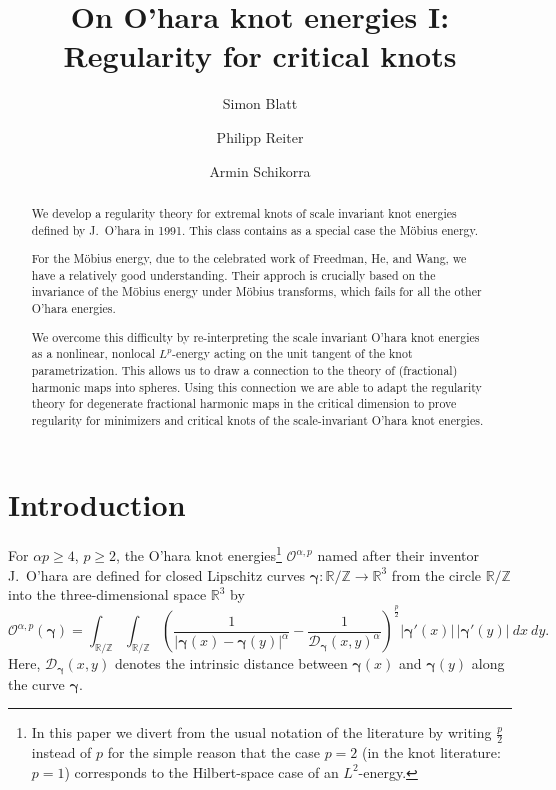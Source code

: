 \documentclass[a4paper,10pt,intlimits,ngerman]{amsart}
\title[O'hara knot energies I]{On O'hara knot energies I: Regularity for critical knots}
\author{Simon Blatt}
\author{Philipp Reiter}
\author{Armin Schikorra}
\numberwithin{equation}{section}
\newcommand{\R}{\mathbb{R}}
\newcommand{\Z}{\mathbb{Z}}
\newcommand{\sol}{{\boldsymbol{\gamma}}}
\newcommand{\brac}[1]{\left ( #1 \right )}
\begin{document}

\begin{abstract}
We develop a regularity theory for extremal knots of scale invariant knot energies defined by J.~O'hara in 1991. This class contains as a special case the M\"obius energy.  

For the M\"obius energy, due to the celebrated work of Freedman, He, and Wang, we have a relatively good understanding. Their approch is crucially based on the invariance of the M\"obius energy under M\"obius transforms, which fails for all the other O'hara energies. 

We overcome this difficulty by re-interpreting the scale invariant O'hara knot energies as a nonlinear, nonlocal $L^p$-energy acting on the unit tangent of the knot parametrization. This allows us to draw a connection to the theory of (fractional) harmonic maps into spheres. Using this connection we are able to adapt the regularity theory for degenerate fractional harmonic maps in the critical dimension to prove regularity for minimizers and critical knots of the scale-invariant O'hara knot energies.
\end{abstract}



\maketitle
\tableofcontents

\section{Introduction}
For $\alpha p \geq 4$, $p \geq 2$, the O'hara knot energies\footnote{In this paper we divert from the usual notation of the literature by writing $\frac{p}{2}$ instead of $p$ for the simple reason that the case $p=2$ (in the knot literature: $p=1$) corresponds to the Hilbert-space case of an $L^2$-energy.} $\mathcal{O}^{\alpha,p}$ named after their inventor J.~O'hara \cite{OH91,OH92} are defined for closed Lipschitz curves $\sol: \R/\Z \to \R^3$ from the circle $\R/\Z$ into the three-dimensional space $\R^3$ by
\begin{equation}\label{eq:oharaenergiesnew}
 \mathcal{O}^{\alpha,p}(\sol)= \int_{\R/\Z} \int_{\R/\Z} \brac{\frac{1}{|\sol(x) - \sol(y)|^\alpha} - \frac 1 {\mathcal{D}_\sol(x,y)^\alpha }}^{\frac{p}{2}} |\sol'(x)|\, |\sol'(y) |\ dx\ dy.
\end{equation}
Here, $\mathcal{D}_\sol(x,y)$ denotes the intrinsic distance between $\sol(x)$ and $\sol(y)$ along the curve $\sol$. 
\end{document}
